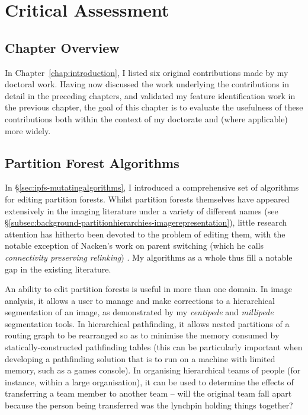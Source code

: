 \chapter{Critical Assessment}
\label{chap:assessment}

\section{Chapter Overview}

In Chapter~\ref{chap:introduction}, I listed six original contributions made by my doctoral work. Having now discussed the work underlying the contributions in detail in the preceding chapters, and validated my feature identification work in the previous chapter, the goal of this chapter is to evaluate the usefulness of these contributions both within the context of my doctorate and (where applicable) more widely.

\section{Partition Forest Algorithms}

In \S\ref{sec:ipfs-mutatingalgorithms}, I introduced a comprehensive set of algorithms for editing partition forests. Whilst partition forests themselves have appeared extensively in the imaging literature under a variety of different names (see \S\ref{subsec:background-partitionhierarchies-imagerepresentation}), little research attention has hitherto been devoted to the problem of editing them, with the notable exception of Nacken's work on parent switching (which he calls \emph{connectivity preserving relinking}) \cite{nacken95}. My algorithms as a whole thus fill a notable gap in the existing literature.

An ability to edit partition forests is useful in more than one domain. In image analysis, it allows a user to manage and make corrections to a hierarchical segmentation of an image, as demonstrated by my \emph{centipede} and \emph{millipede} segmentation tools. In hierarchical pathfinding, it allows nested partitions of a routing graph to be rearranged so as to minimise the memory consumed by statically-constructed pathfinding tables (this can be particularly important when developing a pathfinding solution that is to run on a machine with limited memory, such as a games console). In organising hierarchical teams of people (for instance, within a large organisation), it can be used to determine the effects of transferring a team member to another team -- will the original team fall apart because the person being transferred was the lynchpin holding things together?


